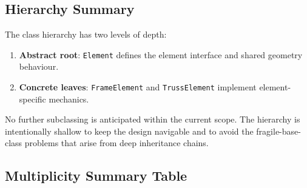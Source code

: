\subsection*{Hierarchy Summary}

The class hierarchy has two levels of depth:

\begin{enumerate}
  \item \textbf{Abstract root}: \texttt{Element} defines the element
  interface and shared geometry behaviour.
  \item \textbf{Concrete leaves}: \texttt{FrameElement} and
  \texttt{TrussElement} implement element-specific mechanics.
\end{enumerate}

No further subclassing is anticipated within the current scope.
The hierarchy is intentionally shallow to keep the design navigable and
to avoid the fragile-base-class problems that arise from deep inheritance
chains.

\subsection*{Multiplicity Summary Table}

